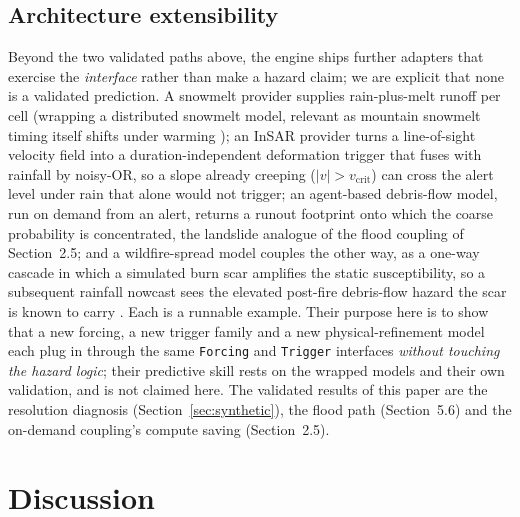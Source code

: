 \documentclass[authoryear,preprint,review,12pt]{elsarticle}
\begin{document}
\subsection{Architecture extensibility}

Beyond the two validated paths above, the engine ships further adapters that
exercise the \emph{interface} rather than make a hazard claim; we are explicit that
none is a validated prediction. A snowmelt provider supplies rain-plus-melt runoff
per cell (wrapping a distributed snowmelt model, relevant as mountain snowmelt
timing itself shifts under warming \citep{musselman2017}); an InSAR provider turns a
line-of-sight velocity field into a duration-independent deformation trigger that
fuses with rainfall by noisy-OR, so a slope already creeping
($|v|>v_{\mathrm{crit}}$) can cross the alert level under rain that alone would not
trigger; an agent-based debris-flow model, run on demand from an alert, returns
a runout footprint onto which the coarse probability is concentrated, the landslide
analogue of the flood coupling of Section~2.5; and a wildfire-spread model couples
the other way, as a one-way cascade in which a simulated burn scar amplifies the
static susceptibility, so a subsequent rainfall nowcast sees the elevated post-fire
debris-flow hazard the scar is known to carry \citep{cannon2008}. Each is a runnable example. Their
purpose here is to show that a new forcing, a new trigger family and a new
physical-refinement model each plug in through the same \texttt{Forcing} and
\texttt{Trigger} interfaces \emph{without touching the hazard logic}; their
predictive skill rests on the wrapped models and their own validation, and is not
claimed here. The validated results of this paper are the resolution diagnosis
(Section~\ref{sec:synthetic}), the flood path (Section~5.6) and the on-demand
coupling's compute saving (Section~2.5).

\section{Discussion}
\end{document}
